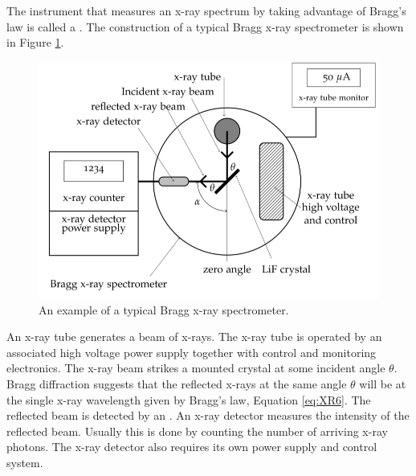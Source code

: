 \noindent The instrument that measures an x-ray spectrum by taking advantage of Bragg’s law is called a . The construction of a typical Bragg x-ray spectrometer is shown in Figure \ref{fig:XR8}.

\begin{figure}[H]
    \centering
    \includegraphics[scale = 0.8]{Images/XR8.PNG}
    \caption{An example of a typical Bragg x-ray spectrometer.}
    \label{fig:XR8}
\end{figure}

\noindent An x-ray tube generates a beam of x-rays. The x-ray tube is operated by an associated high voltage power supply together with control and monitoring electronics. The x-ray beam strikes a mounted crystal at some incident angle $\theta$. Bragg diffraction suggests that the reflected x-rays at the same angle $\theta$ will be at the single x-ray wavelength given by Bragg’s law, Equation \ref{eq:XR6}. The reflected beam is detected by an . An x-ray detector measures the intensity of the reflected beam. Usually this is done by counting the number of arriving x-ray photons. The x-ray detector also requires its own power supply and control system.

